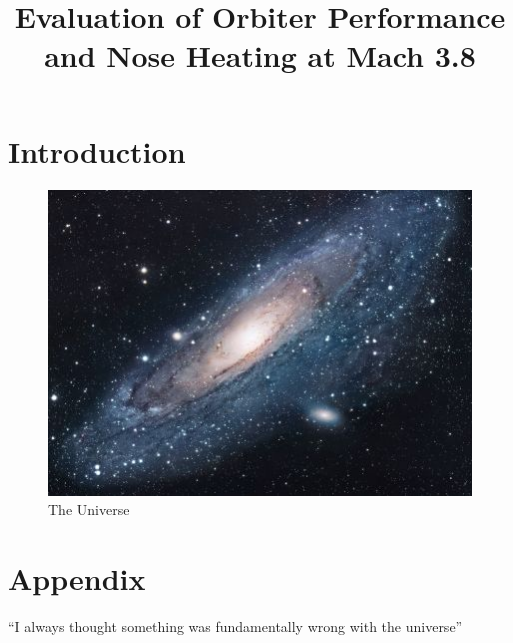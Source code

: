 \documentclass{article}
\title{Evaluation of Orbiter Performance and Nose Heating at Mach 3.8}
\begin{document}
\maketitle

\section{Introduction}


\begin{figure}[h!]
\centering
\includegraphics[scale=1.7]{universe}
\caption{The Universe}
\label{fig:universe}
\end{figure}







\section*{Appendix}
``I always thought something was fundamentally wrong with the universe'' \citep{adams1995hitchhiker}



\end{document}
